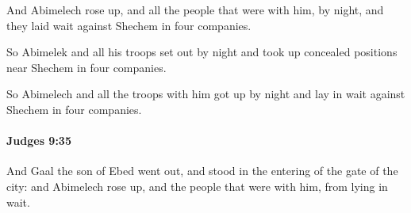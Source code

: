 			\begin{versebox}
					\item[BHS] 
					\item[ASV] And Abimelech rose up, and all the people that were with him, by night, and they laid wait against Shechem in four companies.
					\item[NIV] So Abimelek and all his troops set out by night and took up concealed positions near Shechem in four companies.
					\item[NRSV] So Abimelech and all the troops with him got up by night and lay in wait against Shechem in four companies.
			\end{versebox}

		\paragraph{Judges 9:35} %
			\label{JUDGES-9-35}

			And Gaal the son of Ebed went out, and stood in the entering of the gate of the city: and Abimelech rose up, and the people that were with him, from lying in wait.

